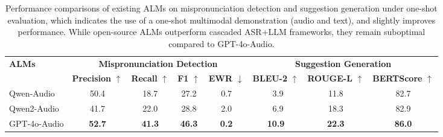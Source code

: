 \begin{table}[t]
\centering

\label{tab:combined_results}
\setlength{\tabcolsep}{6pt}
\small
\begin{tabular}{lccccccc}
\toprule[1pt]
\multirow{2}{*}{\textbf{ALMs}} & \multicolumn{4}{c}{\textbf{Mispronunciation Detection}} & \multicolumn{3}{c}{\textbf{Suggestion Generation}} \\ 
\cmidrule(lr){2-5} \cmidrule(lr){6-8}
 & \textbf{Precision} $\uparrow$ & \textbf{Recall} $\uparrow$ & \textbf{F1} $\uparrow$ & \textbf{EWR} $\downarrow$ & \textbf{BLEU-2} $\uparrow$ & \textbf{ROUGE-L} $\uparrow$ & \textbf{BERTScore} $\uparrow$\\ 
\midrule[0.5pt]
Qwen-Audio   & 50.4 & 18.7 & 27.2 & 0.7 & \,\,\,3.9 & 11.8 & 82.7 \\ %
Qwen2-Audio   & 41.7 & 22.0 & 28.8 & 2.0 & \,\,\,6.9 & 18.3 & 82.9 \\
GPT-4o-Audio & \textbf{52.7} & \textbf{41.3} & \textbf{46.3} & \textbf{0.2} & \textbf{10.9} & \textbf{22.3} & \textbf{86.0} \\
\bottomrule[1pt]
\end{tabular}
\caption{Performance comparisons of existing ALMs on mispronunciation detection and suggestion generation under one-shot evaluation, which indicates the use of a one-shot multimodal demonstration (audio and text), and slightly improves performance. While open-source ALMs outperform cascaded ASR+LLM frameworks, they remain suboptimal compared to GPT-4o-Audio.}
\label{tab:alms_eval_result}
\vspace{-2mm}
\end{table}


